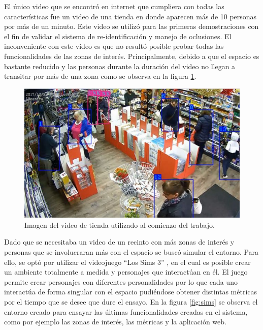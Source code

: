 El único video que se encontró en internet que cumpliera con todas las características fue un video de una tienda \citep{TIENDA_ORIGINAL} en donde aparecen más de 10 personas por más de un minuto. Este video se utilizó para las primeras demostraciones \citep{DEMO:1} con el fin de validar el sistema de re-identificación y manejo de oclusiones. El inconveniente con este video es que no resultó posible probar todas las funcionalidades de las zonas de interés. Principalmente, debido a que el espacio es bastante reducido y las personas durante la duración del video no llegan a transitar por más de una zona como se observa en la figura \ref{fig:tienda}.

\begin{figure}[ht]
	\centering
	\includegraphics[scale=.70]{./Figures/tienda.jpg}
	\caption{Imagen del video de tienda utilizado al comienzo del trabajo.}
	\label{fig:tienda}
\end{figure}

\newpage

Dado que se necesitaba un video de un recinto con más zonas de interés y personas que se involucraran más con el espacio se buscó simular el entorno. Para ello, se optó por utilizar el videojuego ``Los Sims 3'' \citep{SIMS3}, en el cual es posible crear un ambiente totalmente a medida y personajes que interactúan en él. El juego permite crear personajes con diferentes personalidades por lo que cada uno interactúa de forma singular con el espacio pudiéndose obtener distintas métricas por el tiempo que se desee que dure el ensayo. En la figura \ref{fig:sims} se observa el entorno creado para ensayar las últimas funcionalidades creadas en el sistema, como por ejemplo las zonas de interés, las métricas y la aplicación web.


